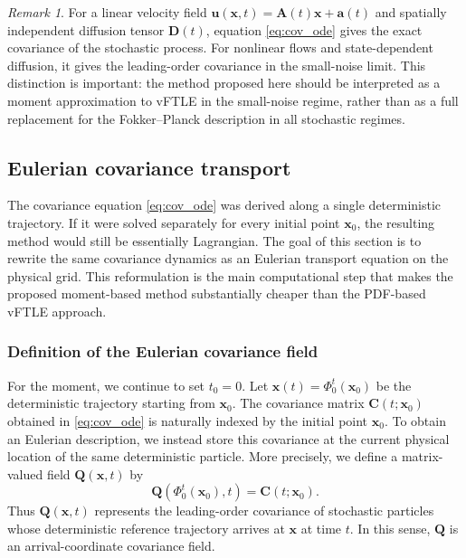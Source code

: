 \documentclass[a4paper,11pt]{article}
\numberwithin{equation}{section}
\theoremstyle{plain}
\theoremstyle{definition}
\theoremstyle{remark}
\newtheorem{remark}[theorem]{Remark}
\newcommand{\bx}{\mathbf{x}}
\newcommand{\bu}{\mathbf{u}}
\newcommand{\ba}{\mathbf{a}}
\newcommand{\bA}{\mathbf{A}}
\newcommand{\bC}{\mathbf{C}}
\newcommand{\bD}{\mathbf{D}}
\newcommand{\bQ}{\mathbf{Q}}
\newcommand{\flow}[2]{\Phi_{#1}^{#2}}
\begin{document}
\begin{remark}
For a linear velocity field \(\bu(\bx,t)=\bA(t)\bx+\ba(t)\) and spatially independent diffusion tensor \(\bD(t)\), equation \eqref{eq:cov_ode} gives the exact covariance of the stochastic process.  For nonlinear flows and state-dependent diffusion, it gives the leading-order covariance in the small-noise limit.  This distinction is important: the method proposed here should be interpreted as a moment approximation to vFTLE in the small-noise regime, rather than as a full replacement for the Fokker--Planck description in all stochastic regimes.
\end{remark}



\subsection{Eulerian covariance transport}

The covariance equation \eqref{eq:cov_ode} was derived along a single deterministic trajectory.  If it were solved separately for every initial point \(\bx_0\), the resulting method would still be essentially Lagrangian.  The goal of this section is to rewrite the same covariance dynamics as an Eulerian transport equation on the physical grid.  This reformulation is the main computational step that makes the proposed moment-based method substantially cheaper than the PDF-based vFTLE approach.

\subsubsection{Definition of the Eulerian covariance field}

For the moment, we continue to set \(t_0=0\).  Let \(\bx(t)=\flow{0}{t}(\bx_0)\) be the deterministic trajectory starting from \(\bx_0\).  The covariance matrix \(\bC(t;\bx_0)\) obtained in \eqref{eq:cov_ode} is naturally indexed by the initial point \(\bx_0\).  To obtain an Eulerian description, we instead store this covariance at the current physical location of the same deterministic particle.  More precisely, we define a matrix-valued field \(\bQ(\bx,t)\) by
\begin{equation}
    \bQ(\flow{0}{t}(\bx_0),t)=\bC(t;\bx_0).
    \label{eq:Q_definition}
\end{equation}
Thus \(\bQ(\bx,t)\) represents the leading-order covariance of stochastic particles whose deterministic reference trajectory arrives at \(\bx\) at time \(t\).  In this sense, \(\bQ\) is an arrival-coordinate covariance field.
\end{document}
